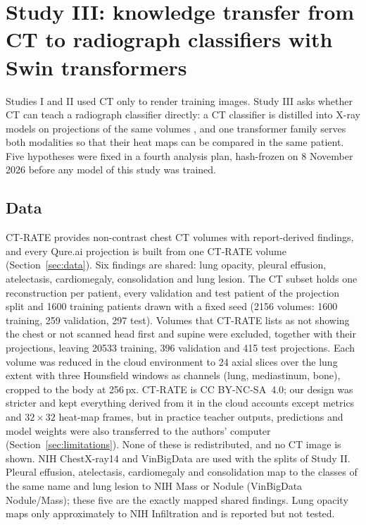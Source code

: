 \section{Study III: knowledge transfer from CT to radiograph classifiers with Swin transformers}
\label{sec:xm}
Studies I and II used CT only to render training images. Study III asks whether CT can teach a radiograph classifier directly: a CT
classifier is distilled \citep{hinton2015distilling} into X-ray models on projections of the same volumes \citep{angaitkar2026anatomy}, and
one transformer family serves both modalities so that their heat maps can be compared in the same patient. Five hypotheses were fixed in a
fourth analysis plan, hash-frozen on 8 November 2026 before any model of this study was trained.

\subsection{Data}
\label{sec:xm_data}
CT-RATE \citep{hamamci2026ctrate} provides non-contrast chest CT volumes with report-derived findings, and every Qure.ai projection is built
from one CT-RATE volume (Section~\ref{sec:data}). Six findings are shared: lung opacity, pleural effusion, atelectasis, cardiomegaly,
consolidation and lung lesion. The CT subset holds one reconstruction per patient, every validation and test patient of the projection split
and \num{1600} training patients drawn with a fixed seed (\num{2156} volumes: \num{1600} training, 259 validation, 297 test). Volumes that
CT-RATE lists as not showing the chest or not scanned head first and supine were excluded, together with their projections, leaving
\num{20533} training, 396 validation and 415 test projections. Each volume was reduced in the cloud environment to 24 axial slices over the
lung extent with three Hounsfield windows as channels (lung, mediastinum, bone), cropped to the body at 256\,px. CT-RATE is CC BY-NC-SA~4.0;
our design was stricter and kept everything derived from it in the cloud accounts except metrics and $32\times32$ heat-map frames, but in
practice teacher outputs, predictions and model weights were also transferred to the authors' computer (Section~\ref{sec:limitations}).
None of these is redistributed, and no CT image is shown. NIH ChestX-ray14 and
VinBigData are used with the splits of Study II. Pleural effusion, atelectasis, cardiomegaly and consolidation map to the classes of the
same name and lung lesion to NIH Mass or Nodule (VinBigData Nodule/Mass); these five are the exactly mapped shared findings. Lung opacity maps
only approximately to NIH Infiltration and is reported but not tested.

